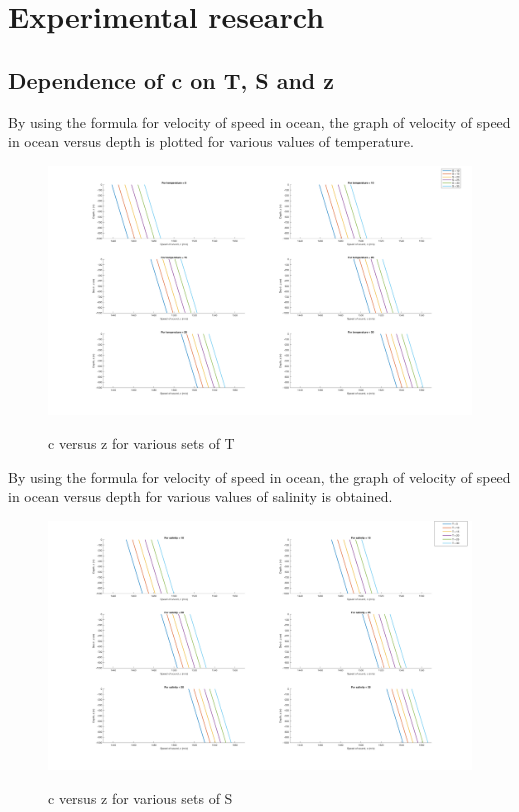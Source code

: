 \chapter*{Experimental research} \label{Experimental research}

\section{Dependence of c on T, S and z } \label{Dependence of c on T, S and z}
\noindent By using the formula for velocity of speed in ocean, the graph of velocity of speed in ocean versus depth is plotted for various values of temperature. 

\begin{figure}[H]
\centering
{\includegraphics[scale=0.18]{ucp1.png}}
\caption{c versus z for various sets of T}
\end{figure}

\noindent By using the formula for velocity of speed in ocean, the graph of velocity of speed in ocean versus depth for various values of salinity is obtained. 

\begin{figure}[H]
\centering
{\includegraphics[scale=0.18]{ucp2.png}}
\caption{c versus z for various sets of S}
\end{figure}

\noindent 
